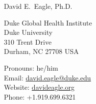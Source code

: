 \documentclass[12pt, letter]{article}
\makeatletter
\newcommand{\FirstName}{David E.}
\newcommand{\LastName}{Eagle}
\newcommand{\Degree}{Ph.D.}
\newcommand{\MyName}{\FirstName\ \LastName, \Degree}
\newcommand{\Email}{david.eagle@duke.edu}
\newcommand{\Website}{davideagle.org}
\newcommand{\Phone}{+1.919.699.6321}
\newcommand{\Affiliation}{
Duke Global Health Institute\\
Duke University
}
\newcommand{\Address}{
    310 Trent Drive\\
    Durham, NC 27708 USA
}
\makeatother
\begin{document}
\setlength{\LTpre}{0pt}
\setlength{\LTpost}{2ex}

\thispagestyle{empty}

\begin{center}
    {\fontsize{24pt}{0}\selectfont \MyName}
    \\[0.3cm]
\end{center}

  \noindent
\begin{minipage}{.6\textwidth}
\Affiliation\\
\Address\\
\end{minipage}
\begin{minipage}{.4\textwidth}
\flushright
Pronouns: he/him\\
Email: \href{mailto:\Email}{\texttt\small{\Email}}\\
Website: {\texttt\small\href{\Website}{\Website}}\\
Phone: \Phone\\
\end{minipage}

\vspace{-1em}








%
\end{document}
